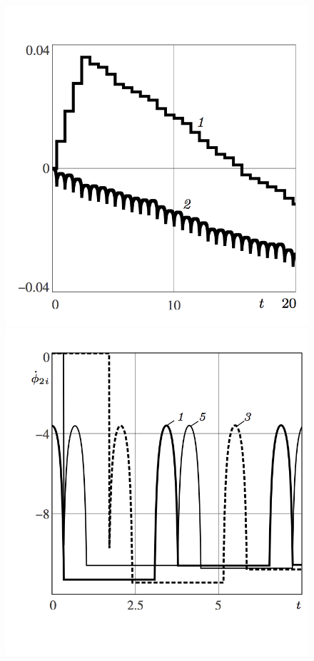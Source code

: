 \begin{figure}[H]
        \includegraphics[scale=1.33]{pic/figure6_1.png}
    \endminipage
    \quad
        \vspace{31pt}
        \includegraphics[scale=1.313]{pic/figure6_2.png}
    \endminipage
  \caption{\ }
  \label{fig:straight}
\end{figure}

